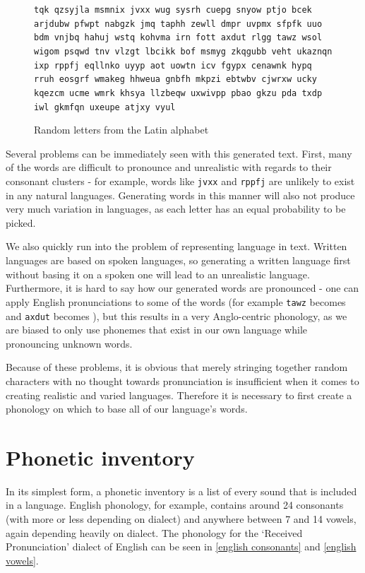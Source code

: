 \documentclass{report}
\begin{document}
   \begin{figure}[h]
   \caption{Random letters from the Latin alphabet}
   \label{random letters from latin alphabet}  
   \begin{tcolorbox}
\texttt{tqk qzsyjla msmnix jvxx wug sysrh cuepg snyow ptjo bcek arjdubw pfwpt nabgzk jmq taphh zewll dmpr uvpmx sfpfk uuo bdm vnjbq hahuj wstq kohvma irn fott axdut rlgg tawz wsol wigom psqwd tnv vlzgt lbcikk bof msmyg zkqgubb veht ukaznqn ixp rppfj eqllnko uyyp aot uowtn icv fgypx cenawnk hypq rruh eosgrf wmakeg hhweua gnbfh mkpzi ebtwbv cjwrxw ucky kqezcm ucme wmrk khsya llzbeqw uxwivpp pbao gkzu pda txdp iwl gkmfqn uxeupe atjxy vyul}
   \end{tcolorbox}
\end{figure}
   
   Several problems can be immediately seen with this generated text. First, many of the words are difficult to pronounce and unrealistic with regards to their consonant clusters - for example, words like \verb|jvxx| and \verb|rppfj| are unlikely to exist in any natural languages. Generating words in this manner will also not produce very much variation in languages, as each letter has an equal probability to be picked.
   
   We also quickly run into the problem of representing language in text. Written languages are based on spoken languages, so generating a written language first without basing it on a spoken one will lead to an unrealistic language. Furthermore, it is hard to say how our generated words are pronounced - one can apply English pronunciations to some of the words (for example \verb|tawz| becomes  and \verb|axdut| becomes ), but this results in a very Anglo-centric phonology, as we are biased to only use phonemes that exist in our own language while pronouncing unknown words.
   
   Because of these problems, it is obvious that merely stringing together random characters with no thought towards pronunciation is insufficient when it comes to creating realistic and varied languages. Therefore it is necessary to first create a phonology on which to base all of our language's words.
   
   \section{Phonetic inventory}
   \label{section: phonetic inventory}
   
   In its simplest form, a phonetic inventory is a list of every sound that is included in a language. English phonology, for example, contains around 24 consonants (with more or less depending on dialect) and anywhere between 7 and 14 vowels, again depending heavily on dialect. The phonology for the `Received Pronunciation' dialect of English can be seen in \ref{english consonants} and \ref{english vowels}.
   
\end{document}
